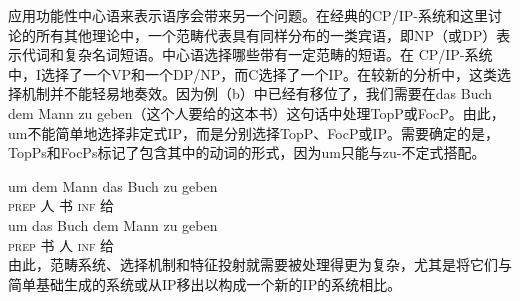 应用功能性中心语来表示语序会带来另一个问题。在经典的CP/IP-系统和这里讨论的所有其他理论中，一个范畴代表具有同样分布的一类宾语，即NP（或DP）表示代词和复杂名词短语。中心语选择哪些带有一定范畴的短语。在
CP/IP-系统中，I选择了一个VP和一个DP/NP，而C选择了一个IP。在较新的分析中，这类选择机制并不能轻易地奏效。因为例（b）中已经有移位了，我们需要在das Buch dem Mann zu
geben（这个人要给的这本书）这句话中处理TopP或FocP。由此，um不能简单地选择非定式IP，而是分别选择TopP、FocP或IP。需要确定的是，TopPs和FocPs标记了包含其中的动词的形式，因为um只能与zu-不定式搭配。

\eal
\ex 
\gll um dem Mann das Buch zu geben\\
     \textsc{prep}  人  书 \textsc{inf} 给\\
\ex 
\gll um das Buch dem Mann zu geben\\
     \textsc{prep}  书  人 \textsc{inf} 给\\
\zl
由此，范畴系统、选择机制和特征投射就需要被处理得更为复杂，尤其是将它们与简单基础生成的系统或从IP移出以构成一个新的IP的系统相比。

